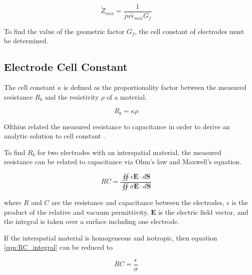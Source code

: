   \begin{equation}
    \tilde{Z}_{mix} = \frac{1}{jw\tilde{\epsilon}_{mix}G_f}
    \label{eqn:impedance_with_Gf}
  \end{equation}
  
  \par To find the value of the geometric factor $G_f$, the cell constant of electrodes must be determined.
  
  
  \subsection{Electrode Cell Constant}
  
  \par The cell constant $\kappa$ is defined as the proportionality factor between the measured resistance $R_b$ and the resistivity $\rho$ of a material.
  
  \begin{equation}
      R_b = \kappa \rho
      \label{eqn:cell_constant_proportionality}
  \end{equation}
  
  \noindent  Olthius related the measured resistance to capacitance in order to derive an analytic solution to cell constant \cite{olthuis_theoretical_1995}. 
  
  \par To find $R_b$ for two electrodes with an interspatial material, the measured resistance can be related to capacitance via Ohm's law and Maxwell's equation.
  
  \begin{equation}
      RC = \frac{\oiint \epsilon \boldsymbol{E} \cdot d\boldsymbol{S}}{\oiint \sigma\boldsymbol{E}\cdot d\boldsymbol{S}}
      \label{eqn:RC_integral}
  \end{equation}
  
  \noindent where $R$ and $C$ are the resistance and capacitance between the electrodes, $\epsilon$ is the product of the relative and vacuum permittivity, $\boldsymbol{E}$ is the electric field vector, and the integral is taken over a surface including one electrode.
  
  \par If the interspatial material is homogeneous and isotropic, then equation \ref{eqn:RC_integral} can be reduced to
  
  \begin{equation}
      RC = \frac{\epsilon}{\sigma}
      \label{eqn:RC}
  \end{equation}
  
